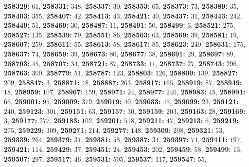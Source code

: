 \textsf{\bfseries 258329:} $61$, \textsf{\bfseries 258331:} $348$, \textsf{\bfseries 258337:} $30$, \textsf{\bfseries 258353:} $65$, \textsf{\bfseries 258373:} $73$, \textsf{\bfseries 258389:} $35$, \textsf{\bfseries 258403:} $355$, \textsf{\bfseries 258407:} $42$, \textsf{\bfseries 258413:} $43$, \textsf{\bfseries 258421:} $40$, \textsf{\bfseries 258437:} $31$, \textsf{\bfseries 258443:} $242$, \textsf{\bfseries 258449:} $51$, \textsf{\bfseries 258469:} $30$, \textsf{\bfseries 258487:} $11$, \textsf{\bfseries 258491:} $50$, \textsf{\bfseries 258499:} $3$, \textsf{\bfseries 258521:} $275$, \textsf{\bfseries 258527:} $135$, \textsf{\bfseries 258539:} $79$, \textsf{\bfseries 258551:} $86$, \textsf{\bfseries 258563:} $63$, \textsf{\bfseries 258569:} $39$, \textsf{\bfseries 258581:} $19$, \textsf{\bfseries 258607:} $259$, \textsf{\bfseries 258611:} $55$, \textsf{\bfseries 258613:} $58$, \textsf{\bfseries 258617:} $85$, \textsf{\bfseries 258623:} $240$, \textsf{\bfseries 258631:} $175$, \textsf{\bfseries 258637:} $74$, \textsf{\bfseries 258659:} $39$, \textsf{\bfseries 258673:} $80$, \textsf{\bfseries 258677:} $38$, \textsf{\bfseries 258691:} $29$, \textsf{\bfseries 258697:} $89$, \textsf{\bfseries 258703:} $45$, \textsf{\bfseries 258707:} $34$, \textsf{\bfseries 258721:} $87$, \textsf{\bfseries 258733:} $11$, \textsf{\bfseries 258737:} $27$, \textsf{\bfseries 258743:} $296$, \textsf{\bfseries 258763:} $300$, \textsf{\bfseries 258779:} $51$, \textsf{\bfseries 258787:} $123$, \textsf{\bfseries 258803:} $126$, \textsf{\bfseries 258809:} $139$, \textsf{\bfseries 258827:} $209$, \textsf{\bfseries 258847:} $3$, \textsf{\bfseries 258871:} $48$, \textsf{\bfseries 258887:} $263$, \textsf{\bfseries 258917:} $165$, \textsf{\bfseries 258919:} $87$, \textsf{\bfseries 258949:} $18$, \textsf{\bfseries 258959:} $107$, \textsf{\bfseries 258967:} $159$, \textsf{\bfseries 258971:} $24$, \textsf{\bfseries 258977:} $246$, \textsf{\bfseries 258983:} $45$, \textsf{\bfseries 258991:} $66$, \textsf{\bfseries 259001:} $95$, \textsf{\bfseries 259009:} $379$, \textsf{\bfseries 259019:} $40$, \textsf{\bfseries 259033:} $45$, \textsf{\bfseries 259099:} $23$, \textsf{\bfseries 259121:} $240$, \textsf{\bfseries 259123:} $301$, \textsf{\bfseries 259151:} $63$, \textsf{\bfseries 259157:} $30$, \textsf{\bfseries 259159:} $203$, \textsf{\bfseries 259163:} $28$, \textsf{\bfseries 259169:} $3$, \textsf{\bfseries 259177:} $277$, \textsf{\bfseries 259183:} $102$, \textsf{\bfseries 259201:} $518$, \textsf{\bfseries 259211:} $47$, \textsf{\bfseries 259213:} $6$, \textsf{\bfseries 259219:} $275$, \textsf{\bfseries 259229:} $309$, \textsf{\bfseries 259271:} $214$, \textsf{\bfseries 259277:} $148$, \textsf{\bfseries 259309:} $208$, \textsf{\bfseries 259321:} $53$, \textsf{\bfseries 259339:} $264$, \textsf{\bfseries 259379:} $31$, \textsf{\bfseries 259381:} $58$, \textsf{\bfseries 259387:} $34$, \textsf{\bfseries 259397:} $74$, \textsf{\bfseries 259411:} $197$, \textsf{\bfseries 259421:} $114$, \textsf{\bfseries 259429:} $37$, \textsf{\bfseries 259451:} $24$, \textsf{\bfseries 259453:} $202$, \textsf{\bfseries 259459:} $58$, \textsf{\bfseries 259499:} $13$, \textsf{\bfseries 259507:} $297$, \textsf{\bfseries 259517:} $46$, \textsf{\bfseries 259531:} $505$, \textsf{\bfseries 259537:} $117$, \textsf{\bfseries 259547:} $55$, 
